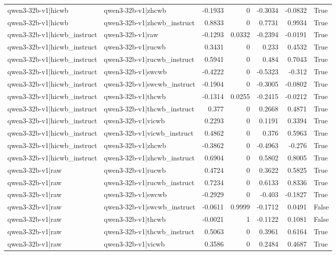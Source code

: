 \begin{table}
\begin{tabular}{l l r r r r l}
qwen3-32b-v1|hicwb & qwen3-32b-v1|zhcwb & -0.1933 & 0 & -0.3034 & -0.0832 & True \\
qwen3-32b-v1|hicwb & qwen3-32b-v1|zhcwb_instruct & 0.8833 & 0 & 0.7731 & 0.9934 & True \\
qwen3-32b-v1|hicwb_instruct & qwen3-32b-v1|raw & -0.1293 & 0.0332 & -0.2394 & -0.0191 & True \\
qwen3-32b-v1|hicwb_instruct & qwen3-32b-v1|rucwb & 0.3431 & 0 & 0.233 & 0.4532 & True \\
qwen3-32b-v1|hicwb_instruct & qwen3-32b-v1|rucwb_instruct & 0.5941 & 0 & 0.484 & 0.7043 & True \\
qwen3-32b-v1|hicwb_instruct & qwen3-32b-v1|swcwb & -0.4222 & 0 & -0.5323 & -0.312 & True \\
qwen3-32b-v1|hicwb_instruct & qwen3-32b-v1|swcwb_instruct & -0.1904 & 0 & -0.3005 & -0.0802 & True \\
qwen3-32b-v1|hicwb_instruct & qwen3-32b-v1|thcwb & -0.1314 & 0.0255 & -0.2415 & -0.0212 & True \\
qwen3-32b-v1|hicwb_instruct & qwen3-32b-v1|thcwb_instruct & 0.377 & 0 & 0.2668 & 0.4871 & True \\
qwen3-32b-v1|hicwb_instruct & qwen3-32b-v1|vicwb & 0.2293 & 0 & 0.1191 & 0.3394 & True \\
qwen3-32b-v1|hicwb_instruct & qwen3-32b-v1|vicwb_instruct & 0.4862 & 0 & 0.376 & 0.5963 & True \\
qwen3-32b-v1|hicwb_instruct & qwen3-32b-v1|zhcwb & -0.3862 & 0 & -0.4963 & -0.276 & True \\
qwen3-32b-v1|hicwb_instruct & qwen3-32b-v1|zhcwb_instruct & 0.6904 & 0 & 0.5802 & 0.8005 & True \\
qwen3-32b-v1|raw & qwen3-32b-v1|rucwb & 0.4724 & 0 & 0.3622 & 0.5825 & True \\
qwen3-32b-v1|raw & qwen3-32b-v1|rucwb_instruct & 0.7234 & 0 & 0.6133 & 0.8336 & True \\
qwen3-32b-v1|raw & qwen3-32b-v1|swcwb & -0.2929 & 0 & -0.403 & -0.1827 & True \\
qwen3-32b-v1|raw & qwen3-32b-v1|swcwb_instruct & -0.0611 & 0.9999 & -0.1712 & 0.0491 & False \\
qwen3-32b-v1|raw & qwen3-32b-v1|thcwb & -0.0021 & 1 & -0.1122 & 0.1081 & False \\
qwen3-32b-v1|raw & qwen3-32b-v1|thcwb_instruct & 0.5063 & 0 & 0.3961 & 0.6164 & True \\
qwen3-32b-v1|raw & qwen3-32b-v1|vicwb & 0.3586 & 0 & 0.2484 & 0.4687 & True \\

\end{tabular}
\end{table}
